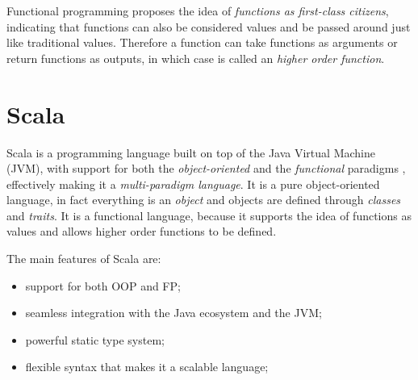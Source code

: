 Functional programming proposes the idea of \textit{functions as first-class citizens}, indicating that functions can also be considered values and be passed around just like traditional values.
%
Therefore a function can take functions as arguments or return functions as outputs, in which case is called an \textit{higher order function}.

\section{Scala}

Scala is a programming language built on top of the Java Virtual Machine (JVM), with support for both the \textit{object-oriented} and the \textit{functional} paradigms \cite{scala-lang-spec}, effectively making it a \textit{multi-paradigm language}.
%
It is a pure object-oriented language, in fact everything is an \textit{object} and objects are defined through \textit{classes} and \textit{traits}.
%
It is a functional language, because it supports the idea of functions as values and allows higher order functions to be defined.

The main features of Scala are:
%
\begin{itemize}
    \item support for both OOP and FP;
    \item seamless integration with the Java ecosystem and the JVM;
    \item powerful static type system;
    \item flexible syntax that makes it a scalable language;
\end{itemize}

